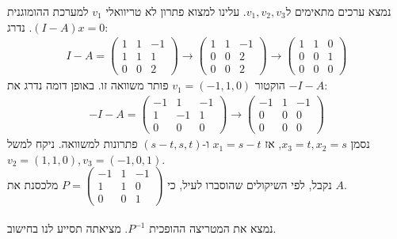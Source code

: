 \documentclass{article}
\begin{document}
נמצא ערכים מתאימים ל$v_1, v_2, v_3$. עלינו למצוא פתרון לא טריוואלי $v_1$ למערכת ההומוגנית $(I-A)x=0$. נדרג:
\begin{align*}
    I-A=
    \begin{pmatrix}
        1 & 1 & -1 \\
        1 & 1 & 1  \\
        0 & 0 & 2
    \end{pmatrix}
    \rightarrow
    \begin{pmatrix}
        1 & 1 & -1 \\
        0 & 0 & 2  \\
        0 & 0 & 2
    \end{pmatrix}
    \rightarrow
    \begin{pmatrix}
        1 & 1 & 0 \\
        0 & 0 & 1 \\
        0 & 0 & 0
    \end{pmatrix}
\end{align*}
הוקטור $v_1=(-1,1,0)$ פותר משוואה זו. באופן דומה נדרג את $-I-A$:
\begin{align*}
    -I-A=\begin{pmatrix}
        -1 & 1  & -1 \\
        1  & -1 & 1  \\
        0  & 0  & 0
    \end{pmatrix}\rightarrow
    \begin{pmatrix}
        -1 & 1 & -1 \\
        0  & 0 & 0  \\
        0  & 0 & 0
    \end{pmatrix}
\end{align*}
נסמן $x_3=t, x_2=s$, אז $x_1=s-t$ ו-$(s-t, s, t)$ פתרונות למשוואה. ניקח למשל $v_2=(1,1,0), v_3=(-1, 0, 1)$. \\
נקבל, לפי השיקולים שהוסברו לעיל, כי $P=\begin{pmatrix}
        -1 & 1 & -1 \\
        1  & 1 & 0  \\
        0  & 0 & 1
    \end{pmatrix}$ מלכסנת את $A$.
\\\\
נמצא את המטריצה ההופכית $P^{-1}$. מציאתה תסייע לנו בחישוב.
\end{document}
